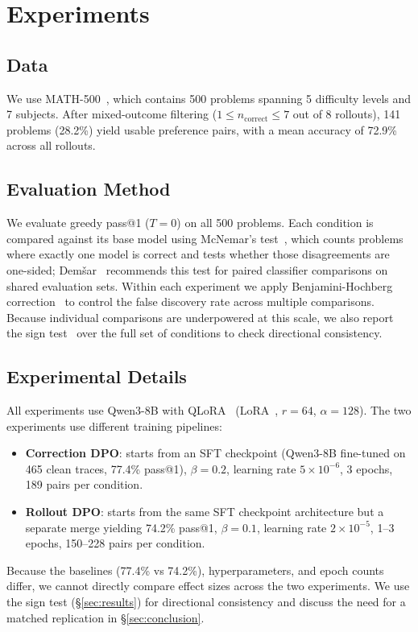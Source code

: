 \documentclass{article}
\begin{document}
\section{Experiments}
\label{sec:experiments}

\subsection{Data}

We use MATH-500~\cite{hendrycks2021math}, which contains 500 problems spanning 5 difficulty levels and 7 subjects.
After mixed-outcome filtering ($1 \leq n_{\text{correct}} \leq 7$ out of 8 rollouts), 141 problems (28.2\%) yield usable preference pairs, with a mean accuracy of 72.9\% across all rollouts.

\subsection{Evaluation Method}

We evaluate greedy pass@1 ($T = 0$) on all 500 problems.
Each condition is compared against its base model using McNemar's test~\cite{mcnemar1947}, which counts problems where exactly one model is correct and tests whether those disagreements are one-sided; Dem\v{s}ar~\cite{demsar2006} recommends this test for paired classifier comparisons on shared evaluation sets.
Within each experiment we apply Benjamini-Hochberg correction~\cite{benjamini1995} to control the false discovery rate across multiple comparisons.
Because individual comparisons are underpowered at this scale, we also report the sign test~\cite{demsar2006} over the full set of conditions to check directional consistency.

\subsection{Experimental Details}

All experiments use Qwen3-8B with QLoRA~\cite{dettmers2023qlora} (LoRA~\cite{hu2022lora}, $r = 64$, $\alpha = 128$).
The two experiments use different training pipelines:
\begin{itemize}
    \item \textbf{Correction DPO}: starts from an SFT checkpoint (Qwen3-8B fine-tuned on 465 clean traces, 77.4\% pass@1), $\beta = 0.2$, learning rate $5 \times 10^{-6}$, 3 epochs, 189 pairs per condition.
    \item \textbf{Rollout DPO}: starts from the same SFT checkpoint architecture but a separate merge yielding 74.2\% pass@1, $\beta = 0.1$, learning rate $2 \times 10^{-5}$, 1--3 epochs, 150--228 pairs per condition.
\end{itemize}
Because the baselines (77.4\% vs 74.2\%), hyperparameters, and epoch counts differ, we cannot directly compare effect sizes across the two experiments.
We use the sign test (\S\ref{sec:results}) for directional consistency and discuss the need for a matched replication in \S\ref{sec:conclusion}.
\end{document}
